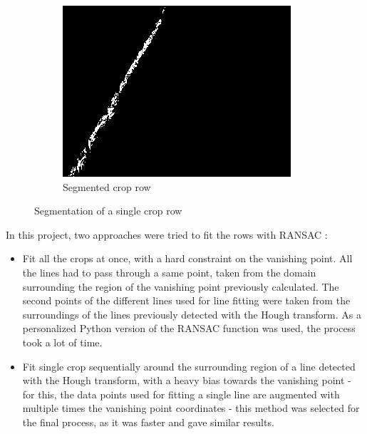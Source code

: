 \begin{figure}[H]
\begin{subfigure}{0.3\textwidth}
\end{subfigure}
\begin{subfigure}{0.3\textwidth}%
    \includegraphics[width=\textwidth]{Report/images/VEGCROPSEG.png}
    \caption{Segmented crop row}
    \label{fig:third}

\end{subfigure}

\caption{Segmentation of a single crop row}
\label{pics: Ransacmasking2}

\end{figure}



In this project, two approaches were tried to fit the rows with RANSAC : 


\begin{itemize}
  \item Fit all the crops at once, with a hard constraint on the vanishing point. All the lines had to pass through a same point, taken from the domain surrounding the region of the vanishing point previously calculated. The second points of the different lines used for line fitting were taken from the surroundings of the lines previously detected with the Hough transform. As a personalized Python version of the RANSAC function was used, the process took a lot of time.
  
  \item Fit single crop sequentially around the surrounding region of a line detected with the Hough transform, with a heavy bias towards the vanishing point - for this, the data points used for fitting a single line are augmented with multiple times the vanishing point coordinates - this method was selected for the final process, as it was faster and gave similar results.
\end{itemize}

